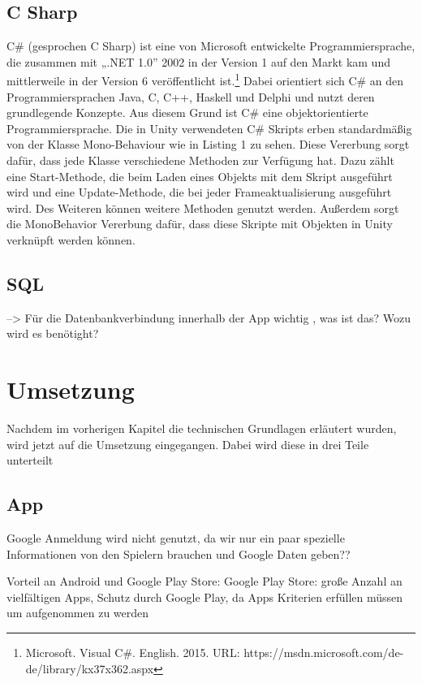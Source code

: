 \section{C Sharp}

C\# (gesprochen C Sharp) ist eine von Microsoft entwickelte Programmiersprache, die zusammen mit „.NET 1.0” 2002 in der Version 1 auf den Markt kam und mittlerweile in der Version 6 veröffentlicht ist.\footnote{Microsoft. Visual C\#. English. 2015. URL: https://msdn.microsoft.com/de-de/library/kx37x362.aspx} Dabei orientiert sich C\# an den Programmiersprachen Java, C, C++, Haskell und Delphi und nutzt deren grundlegende Konzepte. Aus diesem Grund ist C\# eine objektorientierte Programmiersprache. Die in Unity verwendeten C\# Skripts erben standardmäßig von der Klasse Mono-Behaviour wie in Listing 1 zu sehen. Diese Vererbung sorgt dafür, dass jede Klasse verschiedene Methoden zur Verfügung hat. Dazu zählt eine Start-Methode, die beim Laden eines Objekts mit dem Skript ausgeführt wird und eine Update-Methode, die bei jeder Frameaktualisierung ausgeführt wird. Des Weiteren können weitere Methoden genutzt werden. Außerdem sorgt die MonoBehavior Vererbung dafür, dass diese Skripte mit Objekten in Unity verknüpft werden können.

\section{SQL}

	--> Für die Datenbankverbindung innerhalb der App wichtig , was ist das? Wozu wird es benötight?


\chapter{Umsetzung}

	Nachdem im vorherigen Kapitel die technischen Grundlagen erläutert wurden, wird jetzt auf die Umsetzung eingegangen. Dabei wird diese in drei Teile unterteilt

\section{App}
	Google Anmeldung wird nicht genutzt, da wir nur ein paar spezielle Informationen von den Spielern brauchen und Google Daten geben??
	
	Vorteil an Android und Google Play Store: Google Play Store: große Anzahl an vielfältigen Apps, Schutz durch Google Play, da Apps Kriterien erfüllen müssen um aufgenommen zu werden
	
